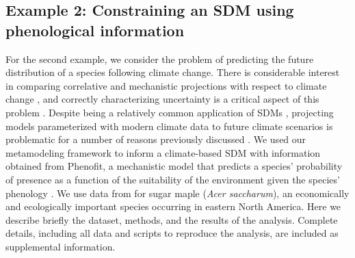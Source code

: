 \subsection*{Example 2: Constraining an SDM using phenological information}
For the second example, we consider the problem of predicting the future distribution of a species following climate change.
There is considerable interest in comparing correlative and mechanistic projections with respect to climate change \citep{Morin2009}, and correctly characterizing uncertainty is a critical aspect of this problem \citep{Cheaib2012}.
Despite being a relatively common application of \ac{SDM}s \citep{Guisan2005}, projecting models parameterized with modern climate data to future climate scenarios is problematic for a number of reasons previously discussed \citep{Araujo2006, Austin2011}.
We used our metamodeling framework to inform a climate-based SDM with information obtained from Phenofit, a mechanistic model that predicts a species' probability of presence as a function of the suitability of the environment given the species' phenology \citep{Chuine2001, Morin2009}.
We use data from \citet{Morin2009} for sugar maple (\emph{Acer saccharum}), an economically and ecologically important species occurring in eastern North America.
Here we describe briefly the dataset, methods, and the results of the analysis.
Complete details, including all data and scripts to reproduce the analysis, are included as supplemental information.

